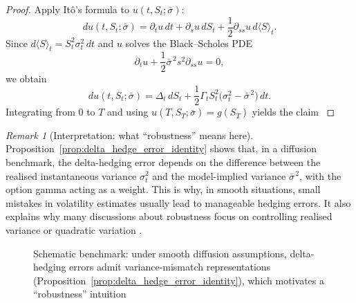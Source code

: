 \documentclass[12pt,a4paper]{article}
\theoremstyle{definition}
\theoremstyle{plain}
\theoremstyle{remark}
\newtheorem{remark}{Remark}[section]
\theoremstyle{plain}
\begin{document}
\begin{proof}
Apply It\^o's formula to $u(t,S_t;\bar\sigma)$:
\[
du(t,S_t;\bar\sigma)
=
\partial_t u\,dt + \partial_s u\,dS_t + \frac{1}{2}\partial_{ss}u\,d\langle S\rangle_t.
\]
Since $d\langle S\rangle_t = S_t^2\sigma_t^2\,dt$ and $u$ solves the Black--Scholes PDE
\[
\partial_t u + \frac{1}{2}\bar\sigma^{\,2}s^2\partial_{ss}u = 0,
\]
we obtain
\[
du(t,S_t;\bar\sigma)
=
\Delta_t\,dS_t
+
\frac{1}{2}\Gamma_t S_t^2\bigl(\sigma_t^2-\bar\sigma^{\,2}\bigr)\,dt.
\]
Integrating from $0$ to $T$ and using $u(T,S_T;\bar\sigma)=g(S_T)$ yields the claim \cite{BlackScholes1973,ElKaroui1998Robustness}
\end{proof}

\begin{remark}[Interpretation: what ``robustness'' means here]\label{rem:robustness_meaning}
Proposition~\ref{prop:delta_hedge_error_identity} shows that, in a diffusion benchmark, the delta-hedging error depends on the difference between the realised instantaneous variance $\sigma_t^2$ and the model-implied variance $\bar\sigma^{\,2}$, with the option gamma acting as a weight.
This is why, in smooth situations, small mistakes in volatility estimates usually lead to manageable hedging errors. It also explains why many discussions about robustness focus on controlling realised variance or quadratic variation \cite{ElKaroui1998Robustness,BlackScholes1973}.
\end{remark}

\begin{figure}[H]
\centering
{}
\caption{Schematic benchmark: under smooth diffusion assumptions, delta-hedging errors admit variance-mismatch representations (Proposition~\ref{prop:delta_hedge_error_identity}), which motivates a ``robustness'' intuition \cite{ElKaroui1998Robustness,BlackScholes1973}}
\label{fig:robustness_benchmark}
\end{figure}
\FloatBarrier
\end{document}
